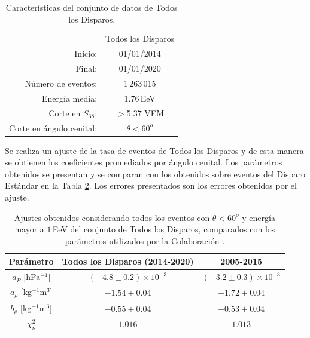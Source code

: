 \begin{table}[H]
  \centering
  \begin{tabular}{r|c|}
    \cline{2-2}
                & Todos los Disparos \\ \cline{2-2}
  Inicio:              & 01/01/2014\\ 
  Final:               & 01/01/2020       							\\ 
  Número de eventos:   & 1\,263\,015							\\ 
  Energía media:       & 1.76\,EeV       				\\  %
  Corte en $S_{38}$:   & $>$5.37 VEM        				\\ 
  Corte en ángulo cenital:& $\theta < 60^o$ 				\\ \cline{2-2}
  \end{tabular}
\caption{Características del conjunto de datos de Todos los Disparos.} \label{tabla:caracteristicas_ALL}
\end{table}

Se realiza un ajuste de la tasa de eventos de Todos los Disparos y de esta manera se obtienen los coeficientes promediados por ángulo cenital. Los parámetros obtenidos se presentan y se comparan con los obtenidos sobre eventos del Disparo Estándar \cite{aab2017impact} en la Tabla \ref{tabla:parametros_ALL}. Los errores presentados son los errores obtenidos por el ajuste.  

\begin{table}[H]
  \centering
  \begin{tabular}{c|c|c}
  {Parámetro}                 & Todos los Disparos (2014-2020)& {2005-2015}    \cite{aab2017impact}              \\ \hline \hline
  $a_P$ [hPa$^{-1}$]          & $(-4.8 \pm 0.2)\times 10^{-3}$& $(-3.2 \pm 0.3)\times 10^{-3}$    \\ \hline
  $a_\rho$ [kg$^{-1}$m$^3$]   & $-1.54 \pm 0.04 $             & $-1.72 \pm 0.04$                  \\ \hline
  $b_\rho$ [kg$^{-1}$m$^3$]   & $-0.55 \pm 0.04$              & $-0.53 \pm 0.04$                  \\ \hline
  $\chi^2_\nu$                & $1.016$                       & $1.013$                           \\ 
  \end{tabular} 
  \caption{Ajustes obtenidos considerando todos los eventos con $\theta<60^o$ y energía mayor a $1\,$EeV del conjunto de Todos los Disparos, comparados con los parámetros utilizados por la Colaboración \cite{aab2017impact}.} \label{tabla:parametros_ALL}
\end{table}


